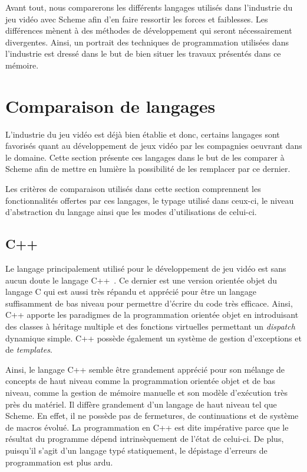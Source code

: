 \documentclass[12pt,oneside,letterpaper,francais]{book}
\begin{document}
Avant tout, nous comparerons les différents langages utilisés dans
l'industrie du jeu vidéo avec Scheme afin d'en faire ressortir les
forces et faiblesses. Les différences mènent à des méthodes de
développement qui seront nécessairement divergentes. Ainsi, un
portrait des techniques de programmation utilisées dans l'industrie
est dressé dans le but de bien situer les travaux présentés dans ce
mémoire.

\section{Comparaison de langages}

L'industrie du jeu vidéo est déjà bien établie et donc, certains
langages sont favorisés quant au développement de jeux vidéo par les
compagnies oeuvrant dans le domaine. Cette section présente ces
langages dans le but de les comparer à Scheme afin de mettre en
lumière la possibilité de les remplacer par ce dernier.

Les critères de comparaison utilisés dans cette section comprennent
les fonctionnalités offertes par ces langages, le typage utilisé dans
ceux-ci, le niveau d'abstraction du langage ainsi que les modes
d'utilisations de celui-ci. 

\subsection{C++}
Le langage principalement utilisé pour le développement de jeu vidéo
est sans aucun doute le langage C++~\cite{cplusplus}. Ce dernier est
une version orientée objet du langage C qui est aussi très répandu et
apprécié pour être un langage suffisamment de bas niveau pour
permettre d'écrire du code très efficace. Ainsi, C++ apporte les
paradigmes de la programmation orientée objet en introduisant des
classes à héritage multiple et des fonctions virtuelles permettant un
\textit{dispatch} dynamique simple. C++ possède également un système
de gestion d'exceptions et de \textit{templates}.

Ainsi, le langage C++ semble être grandement apprécié pour son mélange
de concepts de haut niveau comme la programmation orientée objet et de
bas niveau, comme la gestion de mémoire manuelle et son modèle
d'exécution très près du matériel. Il diffère grandement d'un langage
de haut niveau tel que Scheme. En effet, il ne possède pas de
fermetures, de continuations et de système de macros évolué. La
programmation en C++ est dite impérative parce que le résultat du
programme dépend intrinsèquement de l'état de celui-ci. De plus,
puisqu'il s'agit d'un langage typé statiquement, le dépistage
d'erreurs de programmation est plus ardu.
\end{document}
